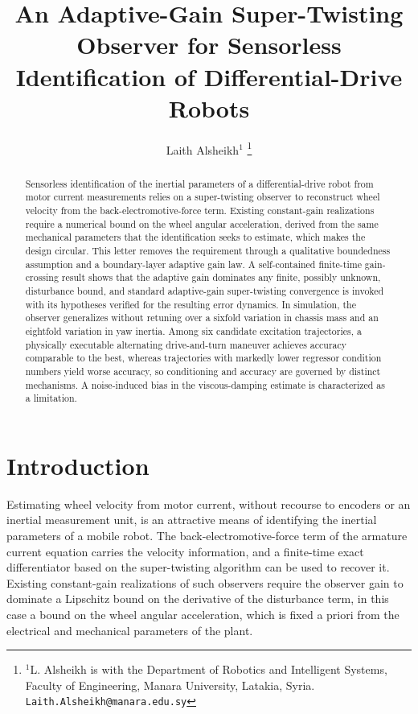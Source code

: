 \documentclass[letterpaper, 10 pt, conference]{ieeeconf}
\title{\LARGE \bf An Adaptive-Gain Super-Twisting Observer for Sensorless\\ Identification of Differential-Drive Robots}
\author{Laith Alsheikh$^{1}$
\thanks{$^{1}$L. Alsheikh is with the Department of Robotics and Intelligent Systems, Faculty of Engineering, Manara University, Latakia, Syria. \texttt{Laith.Alsheikh@manara.edu.sy}}}
\begin{document}
\maketitle
\thispagestyle{empty}
\pagestyle{empty}

\begin{abstract}
Sensorless identification of the inertial parameters of a differential-drive robot from motor current measurements relies on a super-twisting observer to reconstruct wheel velocity from the back-electromotive-force term. Existing constant-gain realizations require a numerical bound on the wheel angular acceleration, derived from the same mechanical parameters that the identification seeks to estimate, which makes the design circular. This letter removes the requirement through a qualitative boundedness assumption and a boundary-layer adaptive gain law. A self-contained finite-time gain-crossing result shows that the adaptive gain dominates any finite, possibly unknown, disturbance bound, and standard adaptive-gain super-twisting convergence is invoked with its hypotheses verified for the resulting error dynamics. In simulation, the observer generalizes without retuning over a sixfold variation in chassis mass and an eightfold variation in yaw inertia. Among six candidate excitation trajectories, a physically executable alternating drive-and-turn maneuver achieves accuracy comparable to the best, whereas trajectories with markedly lower regressor condition numbers yield worse accuracy, so conditioning and accuracy are governed by distinct mechanisms. A noise-induced bias in the viscous-damping estimate is characterized as a limitation.
\end{abstract}

\section{Introduction}
\label{sec:introduction}
Estimating wheel velocity from motor current, without recourse to encoders or an inertial measurement unit, is an attractive means of identifying the inertial parameters of a mobile robot. The back-electromotive-force term of the armature current equation carries the velocity information, and a finite-time exact differentiator based on the super-twisting algorithm \cite{Levant1998,Moreno2012} can be used to recover it. Existing constant-gain realizations of such observers require the observer gain to dominate a Lipschitz bound on the derivative of the disturbance term, in this case a bound on the wheel angular acceleration, which is fixed a priori from the electrical and mechanical parameters of the plant.
\end{document}
